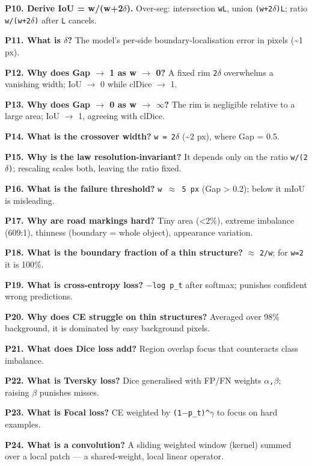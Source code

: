 \documentclass[11pt]{article}
\begin{document}
\textbf{P10. Derive IoU = w/(w+2$\delta$).} Over-seg: intersection \texttt{wL}, union \texttt{(w+2$\delta$)L}; ratio \texttt{w/(w+2$\delta$)} after \texttt{L} cancels.

\textbf{P11. What is $\delta$?} The model's per-side boundary-localisation error in pixels (\textasciitilde{}1 px).

\textbf{P12. Why does Gap $\rightarrow$ 1 as w $\rightarrow$ 0?} A fixed rim \texttt{2$\delta$} overwhelms a vanishing width; IoU $\rightarrow$ 0 while clDice $\rightarrow$ 1.

\textbf{P13. Why does Gap $\rightarrow$ 0 as w $\rightarrow$ $\infty$?} The rim is negligible relative to a large area; IoU $\rightarrow$ 1, agreeing with clDice.

\textbf{P14. What is the crossover width?} \texttt{w = 2$\delta$} (\textasciitilde{}2 px), where Gap = 0.5.

\textbf{P15. Why is the law resolution-invariant?} It depends only on the ratio \texttt{w/(2$\delta$)}; rescaling scales both, leaving the ratio fixed.

\textbf{P16. What is the failure threshold?} \texttt{w $\approx$ 5 px} (Gap > 0.2); below it mIoU is misleading.

\textbf{P17. Why are road markings hard?} Tiny area (<2\%), extreme imbalance (609:1), thinness (boundary = whole object), appearance variation.

\textbf{P18. What is the boundary fraction of a thin structure?} $\approx$ \texttt{2/w}; for \texttt{w=2} it is 100\%.

\textbf{P19. What is cross-entropy loss?} \texttt{$-$log p\_t} after softmax; punishes confident wrong predictions.

\textbf{P20. Why does CE struggle on thin structures?} Averaged over 98\% background, it is dominated by easy background pixels.

\textbf{P21. What does Dice loss add?} Region overlap focus that counteracts class imbalance.

\textbf{P22. What is Tversky loss?} Dice generalised with FP/FN weights \texttt{$\alpha$,$\beta$}; raising \texttt{$\beta$} punishes misses.

\textbf{P23. What is Focal loss?} CE weighted by \texttt{(1$-$p\_t)\textasciicircum{}$\gamma$} to focus on hard examples.

\textbf{P24. What is a convolution?} A sliding weighted window (kernel) summed over a local patch --- a shared-weight, local linear operator.
\end{document}
